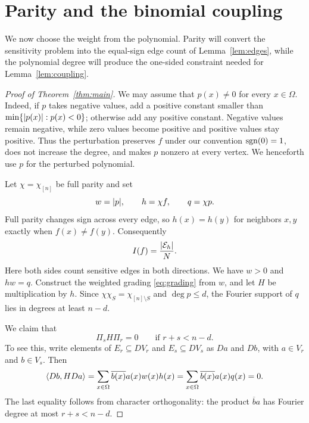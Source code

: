 \section{Parity and the binomial coupling}\label{sec:parity}

We now choose the weight from the polynomial. Parity will convert the
sensitivity problem into the equal-sign edge count of
Lemma~\ref{lem:edges}, while the polynomial degree will produce the
one-sided constraint needed for Lemma~\ref{lem:coupling}.

\begin{proof}[Proof of Theorem~\ref{thm:main}]

We may assume that $p(x)\ne0$ for every $x\in\Omega$.
Indeed, if $p$ takes negative values, add a positive constant smaller than
$\min\{\lvert p(x)\rvert:p(x)<0\}$; otherwise add any positive constant.
Negative values remain negative, while zero values become positive and
positive values stay positive. Thus the perturbation preserves $f$ under
our convention $\operatorname{sgn}(0)=1$, does not increase the degree, and makes $p$
nonzero at every vertex. We henceforth use $p$ for the perturbed polynomial.

Let $\chi=\chi_{[n]}$ be full parity and set
\[
 w=\lvert p\rvert,\qquad h=\chi f,\qquad q=\chi p.
\]
Full parity changes sign across every edge, so $h(x)=h(y)$ for neighbors
$x,y$ exactly when $f(x)\ne f(y)$. Consequently
\begin{equation}\label{eq:sensitivity-count}
 I(f)=\frac{\lvert \mathcal E_h\rvert}N.
\end{equation}
Here both sides count sensitive edges in both directions.
We have $w>0$ and $hw=q$. Construct the weighted grading
\eqref{eq:grading} from $w$, and let $H$ be multiplication by $h$.
Since $\chi\chi_S=\chi_{[n]\setminus S}$ and $\deg p\le d$, the Fourier
support of $q$ lies in degrees at least $n-d$.

We claim that
\begin{equation}\label{eq:vanishing}
 \Pi_sH\Pi_r=0\qquad\text{if }r+s<n-d.
\end{equation}
To see this, write elements of $E_r\subseteq DV_r$ and $E_s\subseteq DV_s$
as $Da$ and $Db$, with $a\in V_r$ and $b\in V_s$. Then
\[
 \langle Db,HDa\rangle=\sum_{x\in\Omega}\overline{b(x)}a(x)w(x)h(x)
 =\sum_{x\in\Omega}\overline{b(x)}a(x)q(x)=0.
\]
The last equality follows from character orthogonality: the product
$\overline b a$ has Fourier degree at most $r+s<n-d$.


\end{proof}
